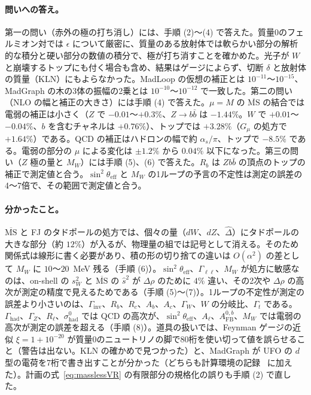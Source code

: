 \documentclass[a4paper,10pt]{ltjsarticle}
\newcommand{\MSbar}{\overline{\mathrm{MS}}}
\begin{document}
\paragraph{問いへの答え。}第一の問い（赤外の極の打ち消し）には、手順 (2)〜(4) で答えた。質量0のフェルミオン対では $\epsilon$ について厳密に、質量のある放射体では軟らかい部分の解析的な積分と硬い部分の数値の積分で、極が打ち消すことを確かめた。光子が $W$ と崩壊するトップにも付く場合も含め、結果はゲージによらず、切断 $\delta$ と放射体の質量（KLN）にもよらなかった。MadLoop の仮想の補正とは $10^{-11}$〜$10^{-15}$、MadGraph の木の3体の振幅の2乗とは $10^{-10}$〜$10^{-12}$ で一致した。第二の問い（NLO の幅と補正の大きさ）には手順 (4) で答えた。$\mu=M$ の $\MSbar$ の結合では電弱の補正は小さく（$Z$ で $-0.01$〜$+0.3\%$、$Z\to b\bar b$ は $-1.44\%$。$W$ で $+0.01$〜$-0.04\%$、$b$ を含むチャネルは $+0.76\%$）、トップでは $+3.28\%$（$G_\mu$ の処方で $+1.64\%$）である。QCD の補正はハドロンの幅で約 $\alpha_s/\pi$、トップで $-8.5\%$ である。電弱の部分の $\mu$ による変化は $\pm1.2\%$ から $0.04\%$ 以下になった。第三の問い（$Z$ 極の量と $M_W$）には手順 (5)、(6) で答えた。$R_b$ は $Zb\bar b$ の頂点のトップの補正で測定値と合う。$\sin^2\theta_{\mathrm{eff}}$ と $M_W$ の1ループの予言の不定性は測定の誤差の4〜7倍で、その範囲で測定値と合う。

\paragraph{分かったこと。}$\MSbar$ と FJ のタドポールの処方では、個々の量（$dW$、$dZ$、$\hat\Delta$）にタドポールの大きな部分（約 $12\%$）が入るが、物理量の組では記号として消える。そのため関係式は線形に書く必要があり、積の形の切り捨ての違いは $O(\alpha^2)$ の差として $M_W$ に $10$〜$20$~MeV 残る（手順 (6)）。$\sin^2\theta_{\mathrm{eff}}$、$\Gamma_{\ell\ell}$、$M_W$ が処方に敏感なのは、on-shell の $s_W^2$ と $\MSbar$ の $\hat s^2$ が $\Delta\rho$ のために $4\%$ 違い、その2次や $\Delta\rho$ の高次が測定の精度で見えるためである（手順 (5)〜(7)）。1ループの不定性が測定の誤差より小さいのは、$\Gamma_{\mathrm{inv}}$、$R_b$、$R_c$、$A_b$、$A_c$、$\Gamma_W$、$W$ の分岐比、$\Gamma_t$ である。$\Gamma_{\mathrm{had}}$、$\Gamma_Z$、$R_\ell$、$\sigma^0_{\mathrm{had}}$ では QCD の高次が、$\sin^2\theta_{\mathrm{eff}}$、$A_\ell$、$A^{0,b}_{\mathrm{FB}}$、$M_W$ では電弱の高次が測定の誤差を超える（手順 (8)）。道具の扱いでは、Feynman ゲージの近似 $\xi=1+10^{-20}$ が質量0のニュートリノの脚で80桁を使い切って値を誤らせること（警告は出ない。KLN の確かめで見つかった）と、MadGraph が UFO の $d$ 型の電荷を7桁で書き出すことが分かった（どちらも計算環境の記録~\cite{env} に加えた）。計画の式~\eqref{eq:masslessVR} の有限部分の規格化の誤りも手順 (2) で直した。
\end{document}
